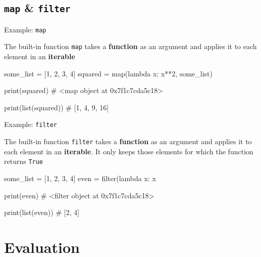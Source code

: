 \subsection{{\tt map} \& {\tt filter}}


\begin{frame}[fragile]{Example: {\tt map}}

    \begin{alertblock}{}
        The built-in function {\tt map} takes a {\bf function} as an argument and applies it to each element in an {\bf iterable}
    \end{alertblock}

    \begin{pythoncode}
some_list = [1, 2, 3, 4]
squared = map(lambda x: x**2, some_list)

print(squared)
# <map object at 0x7f1c7cda5c18>

print(list(squared))
# [1, 4, 9, 16]
    \end{pythoncode}


\end{frame}

\begin{frame}[fragile]{Example: {\tt filter}}

    \begin{alertblock}{}
        The built-in function {\tt filter} takes a {\bf function} as an argument and applies it to each element in an {\bf iterable}. It only keeps those elements for which the function returns {\tt True}
    \end{alertblock}

    \begin{pythoncode}
some_list = [1, 2, 3, 4]
even = filter(lambda x: x %

print(even)
# <filter object at 0x7f1c7cda5c18>

print(list(even))
# [2, 4]
    \end{pythoncode}


\end{frame}

\section{Evaluation}


